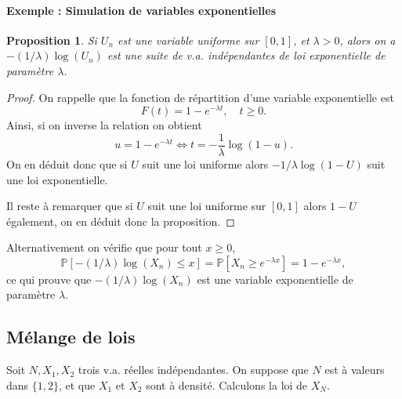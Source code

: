 \documentclass[a4paper,12pt]{book}
\newtheorem{propfr}[thmfr]{Proposition}
\begin{document}
\paragraph{Exemple : Simulation de variables exponentielles}
\begin{propfr}
Si $U_n$ est une variable uniforme sur $[0,1]$, et $\lambda > 0$, alors
on a  $- (1/\lambda) \log (U_n) $  est une suite de v.a. indépendantes de loi exponentielle de paramètre $\lambda$.
\end{propfr}
\begin{proof}
On rappelle que la fonction de répartition d'une variable exponentielle est
$$F(t)=1-e^{-\lambda t}, \quad t\ge 0.$$
Ainsi, si on inverse la relation on obtient
$$u=1-e^{-\lambda t} \Leftrightarrow t= -\frac{1}{\lambda}\log(1-u).$$
On en déduit donc que si $U$ suit une loi uniforme alors $-1/\lambda \log(1-U)$ suit une loi exponentielle.

Il reste à remarquer que si $U$ suit une loi uniforme sur $[0,1]$ alors $1-U$ également, on en déduit donc la proposition.
\end{proof}
Alternativement on vérifie que pour tout $x \geq 0$,
$$\mathbb{P} [ - (1/\lambda) \log (X_n) \leq x] = \mathbb{P} [X_n \geq e^{-\lambda x} ] =  1 - e^{-\lambda x},$$
ce qui prouve que $-(1/\lambda) \log (X_n)$ est une variable exponentielle de param\`etre $\lambda$.



\subsection{M\'elange de lois}
Soit $N,X_1,X_2$ trois v.a. réelles indépendantes. On suppose que $N$ est à valeurs dans $\{1,2\}$, et que $X_1$ et $X_2$ sont à densité. Calculons la loi de $X_N$.
\end{document}
